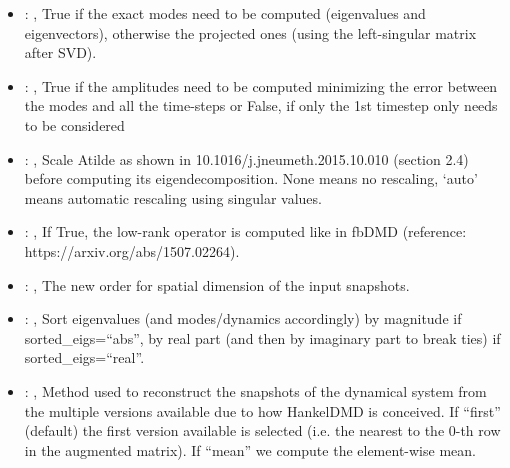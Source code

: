 \begin{itemize}
    \item {}: ,
      True if the exact modes need to be computed (eigenvalues and
      eigenvectors),   otherwise the projected ones (using the left-singular matrix after SVD).

    \item {}: ,
      True if the amplitudes need to be computed minimizing the error
      between the modes and all the time-steps or False, if only the 1st timestep only needs to be
      considered

    \item {}: ,
      Scale Atilde as shown in 10.1016/j.jneumeth.2015.10.010 (section 2.4) before computing its
      eigendecomposition. None means no rescaling, ‘auto’ means automatic rescaling using singular
      values.

    \item {}: ,
      If True, the low-rank operator is computed like in fbDMD (reference:
      https://arxiv.org/abs/1507.02264).

    \item {}: ,
      The new order for spatial dimension of the input snapshots.

    \item {}: ,
      Sort eigenvalues (and modes/dynamics accordingly) by magnitude if sorted\_eigs=``abs'',
      by real part (and then by imaginary part to break ties) if sorted\_eigs=``real''.

    \item {}: ,
      Method used to reconstruct the snapshots of the dynamical system from the multiple versions
      available                                                  due to how HankelDMD is conceived.
      If ``first'' (default) the first version available is selected
      (i.e. the nearest to the 0-th row in the augmented matrix). If ``mean'' we compute the
      element-wise mean.
  \end{itemize}

